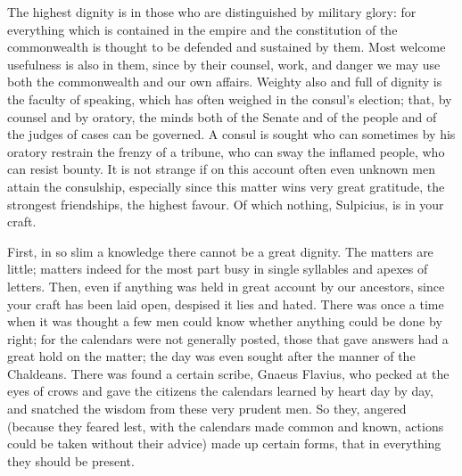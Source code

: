  The highest dignity is in those who are distinguished by military glory: for everything which is contained in the empire and the constitution of the commonwealth is thought to be defended and sustained by them. Most welcome usefulness is also in them, since by their counsel, work, and danger we may use both the commonwealth and our own affairs. Weighty also and full of dignity is the faculty of speaking, which has often weighed in the consul's election; that, by counsel and by oratory, the minds both of the Senate and of the people and of the judges of cases can be governed. A consul is sought who can sometimes by his oratory restrain the frenzy of a tribune, who can sway the inflamed people, who can resist bounty. It is not strange if on this account often even unknown men attain the consulship, especially since this matter wins very great gratitude, the strongest friendships, the highest favour. Of which nothing, Sulpicius, is in your craft.

 First, in so slim a knowledge there cannot be a great dignity. The matters are little; matters indeed for the most part busy in single syllables and apexes of letters. Then, even if anything was held in great account by our ancestors, since your craft has been laid open, despised it lies and hated. There was once a time when it was thought a few men could know whether anything could be done by right; for the calendars were not generally posted, those that gave answers had a great hold on the matter; the day was even sought after the manner of the Chaldeans. There was found a certain scribe, Gnaeus Flavius, who pecked at the eyes of crows and gave the citizens the calendars learned by heart day by day, and snatched the wisdom from these very prudent men. So they, angered (because they feared lest, with the calendars made common and known, actions could be taken without their advice) made up certain forms, that in everything they should be present.

